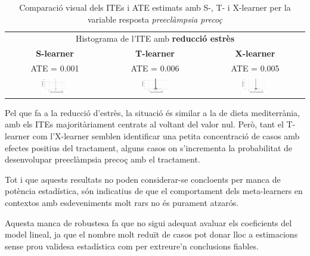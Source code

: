 \documentclass[../main.tex]{subfiles}
\begin{document}
    \begin{table}[H]
        \centering
        \begin{tabular}{ccc}
        \multicolumn{3}{c}{Histograma de l'ITE amb \textbf{reducció estrès}} \\
        \small \textbf{S-learner} & \small \textbf{T-learner} & \small \textbf{X-learner} \\
        \footnotesize ATE = 0.001 & \footnotesize ATE = 0.006 & \footnotesize ATE = 0.005 \\
        \includegraphics[width=0.3\textwidth]{imgs/histogrames/hist(PEearly)S_tract3.jpg} &
        \includegraphics[width=0.3\textwidth]{imgs/histogrames/hist(PEearly)T_tract3.jpg} &
        \includegraphics[width=0.3\textwidth]{imgs/histogrames/hist(PEearly)X_tract3.jpg} \\
        \end{tabular}
        \caption{\footnotesize Comparació visual dels ITEs i ATE estimats amb S-, T- i X-learner per la variable resposta \textit{preeclàmpsia precoç}}
        \label{tab:histITE_PEearly3}
    \end{table}
    
    Pel que fa a la reducció d'estrès, la situació és similar a la de dieta mediterrània, amb els ITEs majoritàriament centrats al voltant del valor nul. Però, tant el T-learner com l’X-learner semblen identificar una petita concentració de casos amb efectes positius del tractament, alguns casos on s'incrementa la probabilitat de desenvolupar preeclàmpsia precoç amb el tractament.\par
    Tot i que aquests resultats no poden considerar-se concloents per manca de potència estadística, són indicatius de que el comportament dels meta-learners en contextos amb esdeveniments molt rars no és purament atzarós.\par
    Aquesta manca de robustesa fa que no sigui adequat avaluar els coeficients del model lineal, ja que el nombre molt reduït de casos pot donar lloc a estimacions sense prou validesa estadística com per extreure’n conclusions fiables.
\end{document}
